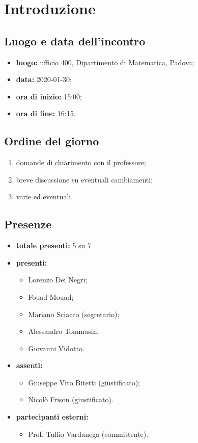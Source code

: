 \section*{Introduzione}

\subsection*{Luogo e data dell'incontro}
	\begin{itemize}
		\item \textbf{luogo:} ufficio 400, Dipartimento di Matematica, Padova;
		\item \textbf{data:} 2020-01-30;
		\item \textbf{ora di inizio:} 15:00;
		\item \textbf{ora di fine:} 16:15.
	\end{itemize}

\subsection*{Ordine del giorno}
	\begin{enumerate}
			\item domande di chiarimento con il professore;
  			\item breve discussione su eventuali cambiamenti;
  			\item varie ed eventuali.
	\end{enumerate}

\subsection*{Presenze}
	\begin{itemize}
		\item \textbf{totale presenti:} 5 su 7
		\item \textbf{presenti: }
			\begin{itemize}			
				\item Lorenzo Dei Negri;
				\item Fouad Mouad;
				\item Mariano Sciacco (segretario);
				\item Alessandro Tommasin;
				\item Giovanni Vidotto.
			\end{itemize}
		\item \textbf{assenti: } 
			\begin{itemize}	
				\item Giuseppe Vito Bitetti (giustificato);
				\item Nicolò Frison (giustificato).
			\end{itemize}
		\item \textbf{partecipanti esterni:}
			\begin{itemize}
				\item Prof. Tullio Vardanega (committente).
			\end{itemize}
	\end{itemize}


